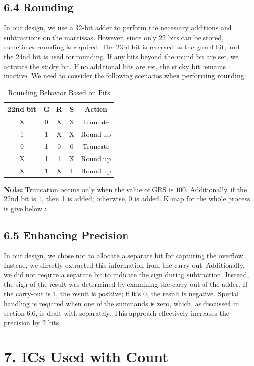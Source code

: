 \documentclass{article}
\begin{document}
\subsection*{6.4 Rounding}
In our design, we use a 32-bit adder to perform the necessary additions and subtractions on the mantissas. However, since only 22 bits can be stored, sometimes rounding is required. The 23rd bit is reserved as the guard bit, and the 24nd bit is used for rounding. If any bits beyond the round bit are set, we activate the sticky bit. If no additional bits are set, the sticky bit remains inactive. We need to consider the following scenarios when performing rounding:

\begin{table}[h!]
\centering
\begin{tabular}{|c|c|c|c|c|}
\hline
\rowcolor{gray!20} \textbf{22nd bit} & \textbf{G} & \textbf{R} & \textbf{S} & \textbf{Action} \\ \hline
\rowcolor{white} X & 0 & X & X & Truncate \\ \hline
\rowcolor{gray!10} 1 & 1 & X & X & Round up \\ \hline
\rowcolor{white} 0 & 1 & 0 & 0 & Truncate \\ \hline
\rowcolor{gray!10} X & 1 & 1 & X & Round up \\ \hline
\rowcolor{gray!10} X & 1 & X & 1 & Round up \\ \hline
\end{tabular}
\caption{Rounding Behavior Based on Bits}
\end{table}
\noindent
\textbf{Note:} Truncation occurs only when the value of GRS is \( 100 \). Additionally, if the 22nd bit is 1, then 1 is added; otherwise, 0 is added.
K map for the whole process is give below :
\subsection*{6.5 Enhancing Precision}
In our design, we chose not to allocate a separate bit for capturing the overflow. Instead, we directly extracted this information from the carry-out. Additionally, we did not require a separate bit to indicate the sign during subtraction. Instead, the sign of the result was determined by examining the carry-out of the adder. If the carry-out is 1, the result is positive; if it's 0, the result is negative. Special handling is required when one of the summands is zero, which, as discussed in section 6.6, is dealt with separately. This approach effectively increases the precision by 2 bits.
\section*{7. ICs Used with Count}
\end{document}
